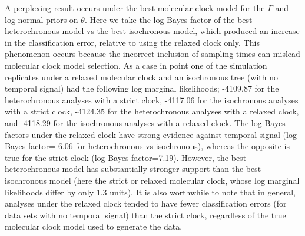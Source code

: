 \documentclass[10pt,letterpaper]{article}
\begin{document}
A perplexing result occurs under the best molecular clock model for the $\Gamma$ and log-normal priors on $\theta$. Here we take the log Bayes factor of the best heterochronous model vs the best isochronous model, which produced an increase in the classification error, relative to using the relaxed clock only. This phenomenon occurs because the incorrect inclusion of sampling times can mislead molecular clock model selection. As a case in point one of the simulation replicates under a relaxed molecular clock and an isochronous tree (with no temporal signal) had the following log marginal likelihoods; -4109.87 for the heterochronous analyses with a strict clock, -4117.06 for the isochronous analyses with a strict clock, -4124.35 for the heterochronous analyses with a relaxed clock, and -4118.29 for the isochronous analyses with a relaxed clock. The log Bayes factors under the relaxed clock have strong evidence against temporal signal (log Bayes factor=-6.06 for heterochronous vs isochronous), whereas the opposite is true for the strict clock (log Bayes factor=7.19). However, the best heterochronous model has substantially stronger support than the best isochronous model (here the strict or relaxed molecular clock, whose log marginal likelihoods differ by only 1.3 units). It is also worthwhile to note that in general, analyses under the relaxed clock tended to have fewer classification errors (for data sets with no temporal signal) than the strict clock, regardless of the true molecular clock model used to generate the data.
\end{document}
